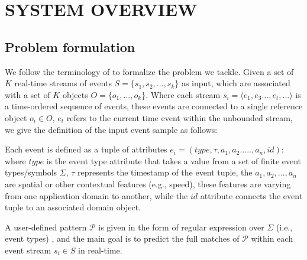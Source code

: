 \section{SYSTEM OVERVIEW}
\subsection{Problem formulation}

We follow the terminology of \cite{luckham2008power,alevizos2015complex,zhou2015pattern} to formalize the problem we tackle. Given a set of $K$ real-time streams of events $S = \{ s_1,s_2, ..., s_k\}$ as input, which are associated with a set of $K$  objects $O = \{ o_1, ..., o_k\}$. Where each stream $s_i=\langle e_1,e_3...,e_t,...\rangle$  is a time-ordered sequence of events, these events are connected to a single reference object $o_i \in O$,  $e_t$  refers to the current time event within the unbounded stream, we give the definition of the input event sample as follows:  
\begin{definition}
	Each event is defined as a tuple of attributes $e_i = (type,\tau,a_1,a_2.....,a_n,id)$:  where $type$ is the event type attribute that takes a value from a set of finite event types/symbols $\Sigma$, $\tau$ represents the timestamp of the event tuple,  the  $a_1,a_2,...,a_n$ are spatial or other contextual features (e.g., speed), these features are varying from one application domain to another, while the $id$ attribute connects the event tuple to an associated domain object.
\end{definition}

A user-defined pattern $\mathcal{P}$ is given in the form of regular expression over $\Sigma$ (i.e., event types) \cite{alevizos2017event}, and the main goal is to predict the full matches of $\mathcal{P}$ within each event stream $s_i\in S$ in real-time.

